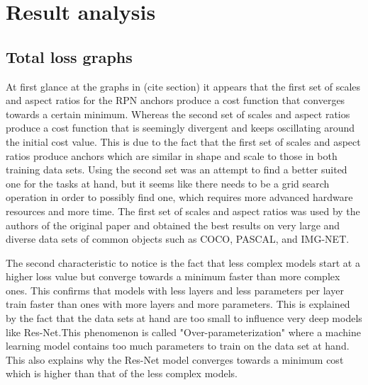 \chapter{Result analysis}
\section{Total loss graphs}
At first glance at the graphs in (cite section) it appears that the first set of scales and aspect ratios for the RPN anchors produce a cost function that converges towards a certain minimum. Whereas the second set of scales and aspect ratios produce a cost function that is seemingly divergent and keeps oscillating around the initial cost value. This is due to the fact that the first set of scales and aspect ratios produce anchors which are similar in shape and scale to those in both training data sets. Using the second set was an attempt to find a better suited one for the tasks at hand, but it seems like there needs to be a grid search operation in order to possibly find one, which requires more advanced hardware resources and more time. The first set of scales and aspect ratios was used by the authors of the original paper and obtained the best results on very large and diverse data sets of common objects such as COCO, PASCAL, and IMG-NET.

The second characteristic to notice is the fact that less complex models start at a higher loss value but converge towards a minimum faster than more complex ones. This confirms that models with less layers and less parameters per layer train faster than ones with more layers and more parameters. This is explained by the fact that the data sets at hand are too small to influence very deep models like Res-Net.This phenomenon is called "Over-parameterization" where a machine learning model contains too much parameters to train on the data set at hand. This also explains why the Res-Net model converges towards a minimum cost which is higher than that of the less complex models.

